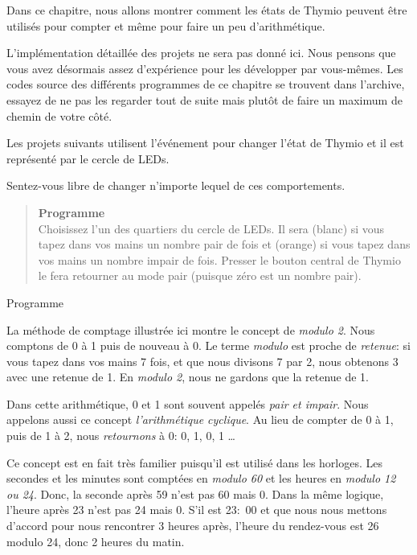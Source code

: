 
\label{ch.counting}

Dans ce chapitre, nous allons montrer comment les états de Thymio peuvent être utilisés pour compter et même pour faire un peu d'arithmétique. 

L'implémentation détaillée des projets ne sera pas donné ici. Nous pensons que vous avez désormais assez d'expérience pour les développer par vous-mêmes. Les codes source des différents programmes de ce chapitre se trouvent dans l'archive, essayez de ne pas les regarder tout de suite mais plutôt de faire un maximum de chemin de votre côté.

Les projets suivants utilisent l'événement  pour changer l'état de Thymio et il est représenté par le cercle de LEDs.


Sentez-vous libre de changer n'importe lequel de ces comportements.


\begin{quote}
\textbf{Programme}\\Choisissez l'un des quartiers du cercle de LEDs. Il sera  (blanc) si vous tapez dans vos mains un nombre pair de fois et  (orange) si vous tapez dans vos mains un nombre impair de fois. Presser le bouton central de Thymio le fera retourner au mode pair (puisque zéro est un nombre pair).
\end{quote}

{\raggedleft \hfill Programme }

La méthode de comptage illustrée ici montre le concept de \emph{modulo 2}. Nous comptons de 0 à 1 puis de nouveau à 0. Le terme \emph{modulo} est proche de \emph{retenue}: si vous tapez dans vos mains 7 fois, et que nous divisons 7 par 2, nous obtenons 3 avec une retenue de 1. En \emph{modulo 2}, nous ne gardons que la retenue de 1.

Dans cette arithmétique, 0 et 1 sont souvent appelés \emph{pair et impair}. Nous appelons aussi ce concept \emph{l'arithmétique cyclique}. Au lieu de compter de 0 à 1, puis de 1 à 2, nous \emph{retournons} à 0: 0, 1, 0, 1 \ldots

Ce concept est en fait très familier puisqu'il est utilisé dans les horloges. Les secondes et les minutes sont comptées en \emph{modulo 60} et les heures en \emph{modulo 12 ou 24}. Donc, la seconde après 59 n'est pas 60 mais 0. Dans la même logique, l'heure après 23 n'est pas 24 mais 0. S'il est 23:\ 00 et que nous nous mettons d'accord pour nous rencontrer 3 heures après, l'heure du rendez-vous est 26 modulo 24, donc 2 heures du matin.

